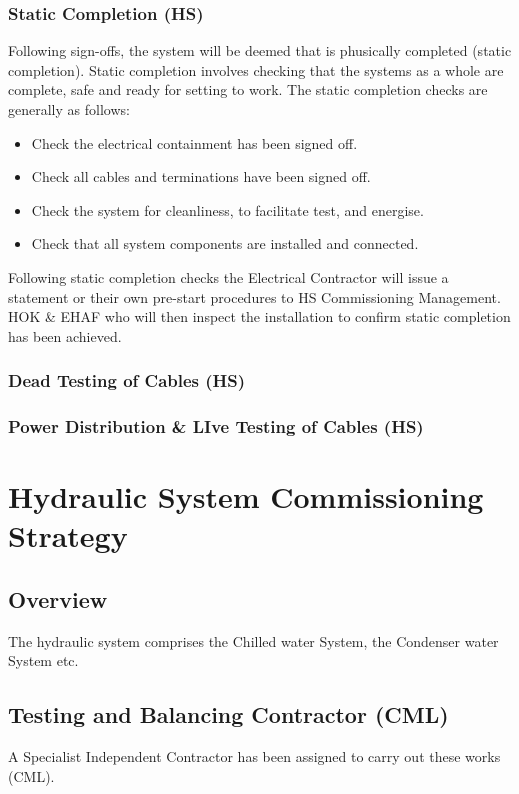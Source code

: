\subsection{Static Completion (HS)}
\label{sec:static}

Following sign-offs, the system will be deemed that is phusically completed (static completion). Static completion involves checking that the systems as a whole are complete, safe and ready for setting to work. The static completion checks are generally as follows:

\begin{itemize}
\item Check the electrical containment has been signed off.
\item Check all cables and terminations have been signed off.
\item Check the system for cleanliness, to facilitate test, and energise.
\item Check that all system components are installed and connected.
\end{itemize}

Following static completion checks the Electrical Contractor will issue a statement or their own pre-start procedures to HS Commissioning Management. HOK \& EHAF who will then inspect the installation to confirm static completion has been achieved.

\subsection{Dead Testing of Cables (HS)}

\subsection{Power Distribution \& LIve Testing of Cables (HS)}


\chapter{Hydraulic System Commissioning Strategy}

\section{Overview}
The hydraulic system comprises the Chilled water System, the Condenser water System etc.
\section{Testing and Balancing Contractor (CML)}
A Specialist Independent Contractor has been assigned to carry out these works (CML). 

